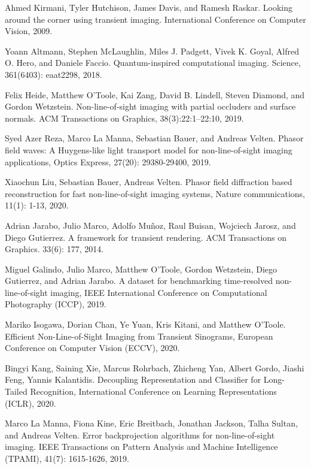 \documentclass[10pt,journal,compsoc]{IEEEtran}
\begin{document}
\begin{thebibliography}{70}
 Ahmed Kirmani, Tyler Hutchison, James Davis, and Ramesh Raskar. Looking around the corner using transient imaging. International Conference on Computer Vision, 2009.

 Yoann Altmann, Stephen McLaughlin, Miles J. Padgett, Vivek K. Goyal, Alfred O. Hero, and Daniele Faccio. Quantum-inspired computational imaging. Science, 361(6403): eaat2298, 2018.

 Felix Heide, Matthew O’Toole, Kai Zang, David B. Lindell, Steven Diamond, and Gordon Wetzstein. Non-line-of-sight imaging with partial occluders and surface normals. ACM Transactions on Graphics, 38(3):22:1–22:10, 2019.

 Syed Azer Reza, Marco La Manna, Sebastian Bauer, and Andreas Velten. Phasor field waves: A Huygens-like light transport model for non-line-of-sight imaging applications, Optics Express, 27(20): 29380-29400, 2019.

 Xiaochun Liu, Sebastian Bauer, Andreas Velten. Phasor field diffraction based reconstruction for fast non-line-of-sight imaging systems, Nature communications, 11(1): 1-13, 2020.

 Adrian Jarabo, Julio Marco, Adolfo Muñoz, Raul Buisan, Wojciech Jarosz, and Diego Gutierrez. A framework for transient rendering. ACM Transactions on Graphics. 33(6): 177, 2014.

 Miguel Galindo, Julio Marco, Matthew O’Toole, Gordon Wetzstein, Diego Gutierrez, and Adrian Jarabo. A dataset for benchmarking time-resolved non-line-of-sight imaging, IEEE International Conference on Computational Photography (ICCP), 2019.

 Mariko Isogawa, Dorian Chan, Ye Yuan, Kris Kitani, and Matthew O'Toole. Efficient Non-Line-of-Sight Imaging from Transient Sinograms, European Conference on Computer Vision (ECCV), 2020.

 Bingyi Kang, Saining Xie, Marcus Rohrbach, Zhicheng Yan, Albert Gordo, Jiashi Feng, Yannis Kalantidis. Decoupling Representation and Classifier for Long-Tailed Recognition, International Conference on Learning Representations (ICLR), 2020.

 Marco La Manna, Fiona Kine, Eric Breitbach, Jonathan Jackson, Talha Sultan, and Andreas Velten. Error backprojection algorithms for non-line-of-sight imaging. IEEE Transactions on Pattern Analysis and Machine Intelligence (TPAMI), 41(7): 1615-1626, 2019.


\end{thebibliography}
\end{document}
